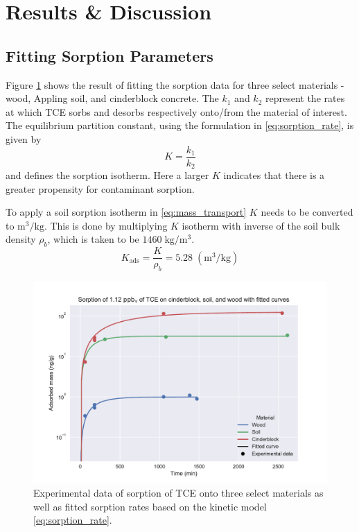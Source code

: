 \section{Results \& Discussion}\label{sec:results}

\subsection{Fitting Sorption Parameters}\label{sec:results_sorption_fit}
Figure \ref{fig:sorption_fit} shows the result of fitting the sorption data for three select materials - wood, Appling soil, and cinderblock concrete.
The $k_1$ and $k_2$ represent the rates at which TCE sorbs and desorbs respectively onto/from the material of interest.
The equilibrium partition constant, using the formulation in \eqref{eq:sorption_rate}, is given by
\begin{equation}
  K = \frac{k_1}{k_2}
\end{equation}
and defines the sorption isotherm.
Here a larger $K$ indicates that there is a greater propensity for contaminant sorption.\par

To apply a soil sorption isotherm in \eqref{eq:mass_transport} $K$ needs to be converted to $\mathrm{m^3/kg}$.
This is done by multiplying $K$ isotherm with inverse of the soil bulk density $\rho_b$, which is taken to be $1460 \; \mathrm{kg/m^3}$. %
\begin{equation}
  K_\mathrm{ads} = \frac{K}{\rho_b} = 5.28 \; \mathrm{(m^3/kg)}
\end{equation}

\begin{figure}[htb!]
  \includegraphics[width=\textwidth]{sorption_fit.pdf}
  \caption{Experimental data of sorption of TCE onto three select materials as well as fitted sorption rates based on the kinetic model \eqref{eq:sorption_rate}.}
  \label{fig:sorption_fit}
\end{figure}

